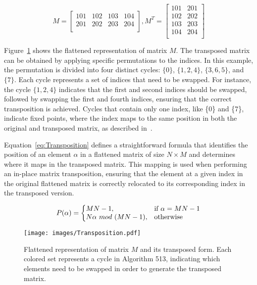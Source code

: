 \begin{equation}
  M = 
  \begin{bmatrix}
    101 & 102 & 103 & 104 \\
    201 & 202 & 203 & 204 \\
  \end{bmatrix}
  , M^{T} =
  \begin{bmatrix}
    101 & 201 \\
    102 & 202 \\
    103 & 203\\
    104 & 204\\
  \end{bmatrix} 
\end{equation}

Figure~\ref{fig:Transposition} shows the flattened representation of matrix $M$. The transposed matrix can be obtained by applying specific permutations to the indices. In this example, the permutation is divided into four distinct cycles: $\{0\}$, $\{1,2,4\}$, $\{3,6,5\}$, and $\{7\}$. Each cycle represents a set of indices that need to be swapped. For instance, the cycle $\{1,2,4\}$ indicates that the first and second indices should be swapped, followed by swapping the first and fourth indices, ensuring that the correct transposition is achieved. Cycles that contain only one index, like \{0\} and \{7\}, indicate fixed points, where the index maps to the same position in both the original and transposed matrix, as described in~\cite{Algorithm_513}.

Equation~\ref{eq:Transposition} defines a straightforward formula that identifies the position of an element $\alpha$ in a flattened matrix of size $N \times M$ and determines where it maps in the transposed matrix. This mapping is used when performing an in-place matrix transposition, ensuring that the element at a given index in the original flattened matrix is correctly relocated to its corresponding index in the transposed version.

\begin{equation}
    P(\alpha) =\left\{
      \begin{array}{@{}ll@{}}
        MN-1, & \text{if}\ \alpha=MN-1 \\
        N\alpha \ mod \ (MN-1), & \text{otherwise}
      \end{array}\right. 
      \label{eq:Transposition}
\end{equation}

\begin{figure}[t!]
    \centering
    \texttt{[image: images/Transposition.pdf]}
    \vskip -0.10in
    \caption{Flattened representation of matrix $M$ and its transposed form. Each colored set represents a cycle in Algorithm 513, indicating which elements need to be swapped in order to generate the transposed matrix.}
    \label{fig:Transposition}
    \vskip -0.10in
\end{figure}

